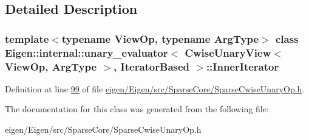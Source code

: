 \subsection{Detailed Description}
\subsubsection*{template$<$typename View\+Op, typename Arg\+Type$>$\newline
class Eigen\+::internal\+::unary\+\_\+evaluator$<$ Cwise\+Unary\+View$<$ View\+Op, Arg\+Type $>$, Iterator\+Based $>$\+::\+Inner\+Iterator}



Definition at line \hyperlink{eigen_2_eigen_2src_2_sparse_core_2_sparse_cwise_unary_op_8h_source_l00099}{99} of file \hyperlink{eigen_2_eigen_2src_2_sparse_core_2_sparse_cwise_unary_op_8h_source}{eigen/\+Eigen/src/\+Sparse\+Core/\+Sparse\+Cwise\+Unary\+Op.\+h}.



The documentation for this class was generated from the following file\+:\begin{DoxyCompactItemize}
\item 
eigen/\+Eigen/src/\+Sparse\+Core/\+Sparse\+Cwise\+Unary\+Op.\+h\end{DoxyCompactItemize}
